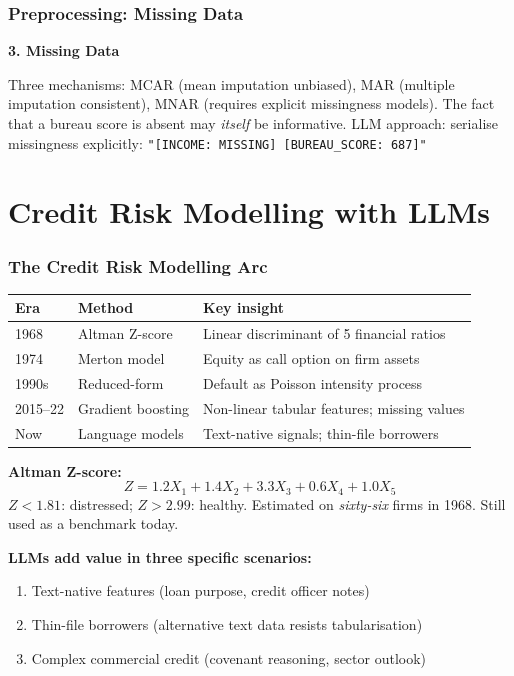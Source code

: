 \documentclass[9pt,t]{beamer}
\begin{document}
\begin{frame}
\frametitle{Preprocessing: Missing Data}

\textbf{3. Missing Data}

Three mechanisms: MCAR (mean imputation unbiased), MAR (multiple imputation consistent),
MNAR (requires explicit missingness models). The fact that a bureau score is absent may
\emph{itself} be informative. LLM approach: serialise missingness explicitly:
\texttt{"[INCOME: MISSING] [BUREAU\_SCORE: 687]"}
\end{frame}

\section{Credit Risk Modelling with LLMs}

\begin{frame}
\frametitle{The Credit Risk Modelling Arc}

\begin{center}
\begin{tabular}{lll}
\toprule
\textbf{Era} & \textbf{Method} & \textbf{Key insight} \\
\midrule
1968 & Altman Z-score & Linear discriminant of 5 financial ratios \\
1974 & Merton model & Equity as call option on firm assets \\
1990s & Reduced-form & Default as Poisson intensity process \\
2015--22 & Gradient boosting & Non-linear tabular features; missing values \\
Now & Language models & Text-native signals; thin-file borrowers \\
\bottomrule
\end{tabular}
\end{center}

\medskip
\textbf{Altman Z-score:}
\[
  Z = 1.2 X_1 + 1.4 X_2 + 3.3 X_3 + 0.6 X_4 + 1.0 X_5
\]
$Z < 1.81$: distressed; $Z > 2.99$: healthy. Estimated on \emph{sixty-six} firms in 1968.
Still used as a benchmark today.

\medskip
\textbf{LLMs add value in three specific scenarios:}
\begin{enumerate}
  \item Text-native features (loan purpose, credit officer notes)
  \item Thin-file borrowers (alternative text data resists tabularisation)
  \item Complex commercial credit (covenant reasoning, sector outlook)
\end{enumerate}
\end{frame}
\end{document}
